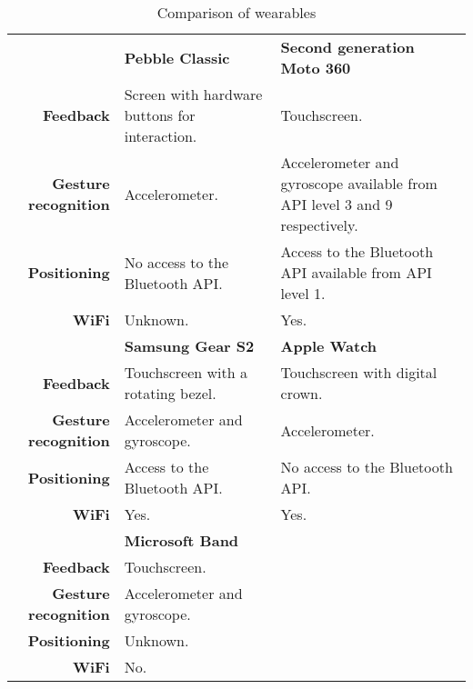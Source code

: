 \renewcommand{\arraystretch}{1.2}
\begin{table}[!htb]
\centering
\caption{Comparison of wearables}
\label{tbl:analysis:choice-of-wearable}
\begin{tabularx}{\linewidth}{rXX}
\multicolumn{1}{l}{\textbf{}}     & \textbf{Pebble Classic}                       & \textbf{Second generation Moto 360} \\
\textbf{Feedback} & Screen with hardware buttons for interaction. & Touchscreen.                        \\
\textbf{Gesture recognition}      & Accelerometer.~\cite{pebble:accelerometer}                                & Accelerometer and gyroscope available from API level 3 and 9 respectively.~\cite{motorola:moto360, android:creating-wearable-apps, android:motion-sensors, android:sensors-overview}        \\
\textbf{Positioning}              & No access to the Bluetooth API.               & Access to the Bluetooth API available from API level 1.~\cite{motorola:moto360, android:creating-wearable-apps, android:Bluetooth, android:broadcast-receiver}        \\
\textbf{WiFi}                     & Unknown.    & Yes.                                \\
\multicolumn{1}{l}{}              & \textbf{Samsung Gear S2}                      & \textbf{Apple Watch}                \\
\textbf{Feedback} & Touchscreen with a rotating bezel.             & Touchscreen with digital crown.     \\
\textbf{Gesture recognition}      & Accelerometer and gyroscope.~\cite{samsung:gears2, tizen:sensors}                  & Accelerometer.                      \\
\textbf{Positioning}              & Access to the Bluetooth API.~\cite{samsung:gears2, tizen:Bluetooth}                  & No access to the Bluetooth API.     \\
\textbf{WiFi}                     & Yes.                                          & Yes.                               \\
\multicolumn{1}{l}{}              & \textbf{Microsoft Band}                      & ~                \\
\textbf{Feedback} & Touchscreen.            & ~     \\
\textbf{Gesture recognition}      & Accelerometer and gyroscope.~\cite{microsoft:band-sdk, microsoft:band-sdk-documentation}                  & ~                      \\
\textbf{Positioning}              & Unknown.                  & ~     \\
\textbf{WiFi}                     & No.                                          & ~                               
\end{tabularx}
\end{table}

